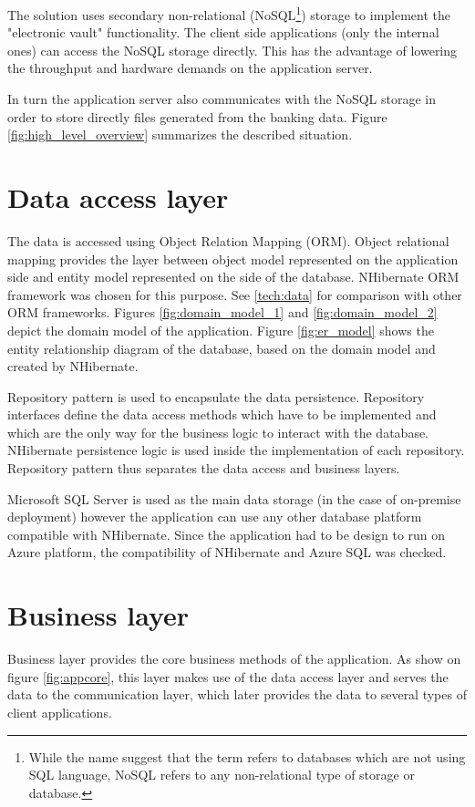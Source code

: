 The solution uses secondary non-relational (NoSQL\footnote{While the name suggest that the term refers to databases which are not using SQL language, NoSQL refers to any non-relational type of storage or database.}) storage to implement the "electronic vault" functionality. The client side applications (only the internal ones) can access the NoSQL storage directly. This has the advantage of lowering the throughput and hardware demands on the application server.

In turn the application server also communicates with the NoSQL storage in order to store directly files generated from the banking data. Figure \ref{fig:high_level_overview} summarizes the described situation.

\section{Data access layer}
The data is accessed using Object Relation Mapping (ORM)\cite{wiki:ORM}. Object relational mapping provides the layer between object model represented on the application side and entity model represented on the side of the database. NHibernate ORM framework\cite{NHib09} was chosen for this purpose. See \ref{tech:data} for comparison with other ORM frameworks. Figures \ref{fig:domain_model_1} and \ref{fig:domain_model_2} depict the domain model of the application. Figure \ref{fig:er_model} shows the entity relationship diagram of the database, based on the domain model and created by NHibernate.

Repository pattern is used to encapsulate the data persistence. Repository interfaces define the data access methods which have to be implemented and which are the only way for the business logic to interact with the database. NHibernate persistence logic is used inside the implementation of each repository. Repository pattern thus separates the data access and business layers.

Microsoft SQL Server is used as the main data storage (in the case of on-premise deployment) however the application can use any other database platform compatible with NHibernate. Since the application had to be design to run on Azure platform, the compatibility of NHibernate and Azure SQL was checked.

\section{Business layer}
\label{analysis:business_layer}
Business layer provides the core business methods of the application. As show on figure \ref{fig:appcore}, this layer makes use of the data access layer and serves the data to the communication layer, which later provides the data to several types of client applications.

